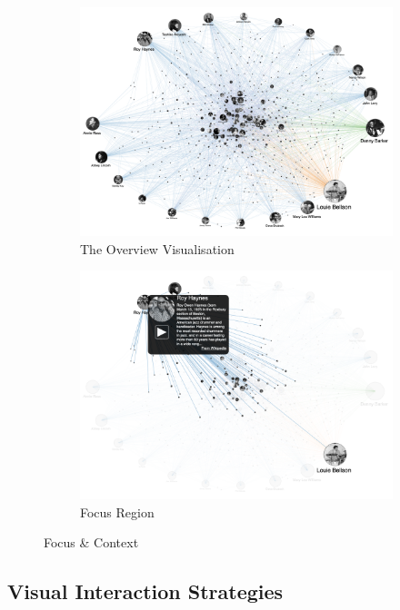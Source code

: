 \begin{figure}[H]
\begin{subfigure}{.45\textwidth}
  \centering
  \captionsetup{justification=centering}
  \includegraphics[width=.8\linewidth]{./pics/f1}  
  \caption{The Overview Visualisation}
  \label{fig:sub-first-f}
\end{subfigure}
\begin{subfigure}{.45\textwidth}
  \centering
  \captionsetup{justification=centering}
  \includegraphics[width=.8\linewidth]{./pics/f2}  
  \caption{Focus Region}
  \label{fig:sub-second-f}
\end{subfigure}
\captionsetup{justification=centering}
\caption{Focus \& Context \cite{linkedjazz}}
\label{fig:FocusANDContext}
\end{figure}

\subsection{Visual Interaction Strategies}

